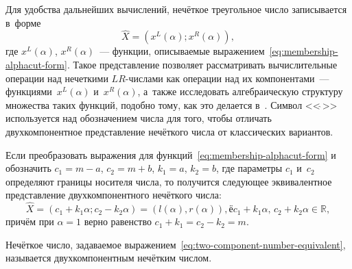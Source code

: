 Для удобства дальнейших вычислений, нечёткое треугольное число записывается в~форме
\begin{equation}
\label{eq:two-component-number}
  \hat{X} = \left(x^L\left(\alpha \right); x^R\left(\alpha \right) \right),
\end{equation}
где $x^L\left(\alpha \right)$, $x^R\left(\alpha \right)$~--- функции, описываемые выражением~\eqref{eq:membership-alphacut-form}. Такое представление позволяет рассматривать вычислительные операции над нечеткими $LR$-числами как операции над их компонентами~---  функциями~$x^L\left(\alpha \right)$ и~$x^R\left(\alpha \right)$, а~также исследовать алгебраическую структуру множества таких функций, подобно тому, как это делается в~\cite{Kosinski}. Символ <<$\hat{\ }$>> используется над обозначением числа для того, чтобы отличать двухкомпонентное представление нечёткого числа от классических вариантов.

Если преобразовать выражения для функций~\eqref{eq:membership-alphacut-form} и обозначить $c_1=m-a$, $c_2=m+b$, $k_1=a$, $k_2=b$, где параметры $c_1$ и~$c_2$ определяют границы носителя числа, то получится следующее эквивалентное представление  двухкомпонентного нечёткого числа:
\begin{equation}
\label{eq:two-component-number-equivalent}
  \hat{X} = \left(c_1+k_1\alpha; c_2-k_2\alpha \right) = \left(l\left(\alpha \right), r\left(\alpha \right) \right),ё c_1+k_1\alpha,\, c_2+k_2\alpha \in \mathbb{R},
\end{equation}
причём при $\alpha=1$ верно равенство $c_1+k_1=c_2-k_2=m$.

\begin{mydef}
  Нечёткое число, задаваемое выражением~\eqref{eq:two-component-number-equivalent}, называется двухкомпонентным нечётким числом.
\end{mydef}

